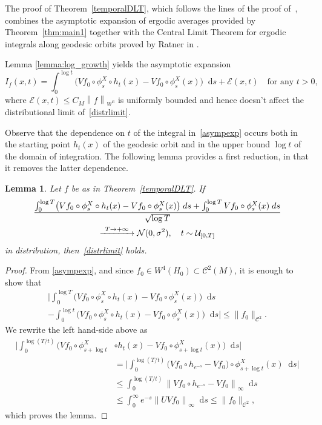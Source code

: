 \documentclass[11pt]{article}
\newcommand\To[1]{\mathchoice{\xrightarrow{\kern4pt#1\kern3pt}}{\stackrel{#1}{\longrightarrow}}{}{}}
\newcommand{\nnorm}[1]{\lVert#1\rVert}
\newcommand {\cN}{\mathcal{N}}
\newcommand*{\diff}{\mathop{}\!\mathrm{d}}
\newcommand{\norm}[1]{\left\lVert#1\right\rVert}
\newtheorem {lemma}[theorem]{Lemma}
\theoremstyle{definition}
\begin{document}
\begin{appendix}
The proof of Theorem~\ref{temporalDLT}, which follows the lines of the proof of~\cite[Th.\,5.1]{Dolgopyat-Sarig}, combines the asymptotic expansion of ergodic averages provided by Theorem~\ref{thm:main1} together with the Central Limit Theorem for ergodic integrals along geodesic orbits proved by Ratner in \cite{Rat:CLT}.

Lemma \ref{lemma:log_growth} yields the asymptotic expansion
\begin{equation}
\label{asympexp}
I_f(x,t)=\int_0^{\log{t}}\bigl(Vf_0\circ \phi^{X}_s\circ h_t(x)-Vf_0\circ \phi_s^{X}(x) \bigr)\diff s +\mathcal{E}(x,t) \quad\text{for any }t>0,
\end{equation}
where $\mathcal{E}(x,t) \leq C_M\norm{f}_{W^6}$ is uniformly bounded and hence doesn't affect the distributional limit of~\eqref{distrlimit}.

Observe that the dependence on $t$ of the integral in~\eqref{asympexp} occurs both in the starting point $h_t(x)$ of the geodesic orbit and in the upper bound $\log{t}$ of the domain of integration. The following lemma provides a first reduction, in that it removes the latter dependence.

\begin{lemma}
Let $f$ be as in Theorem~\ref{temporalDLT}. If
\begin{multline*}
\frac{\int_0^{\log{T}}\bigl(Vf_0\circ \phi^{X}_s\circ h_t(x)-Vf_0\circ \phi_s^{X}(x) \bigr)\;\emph{d}s+\int_0^{\log{T}}Vf_0\circ\phi^{X}_s(x)\;\emph{d}s}{\sqrt{\log{T}}}\\
\To{T\to+\infty}\cN(0,\sigma^{2}), \quad
 t\sim \mathcal{U}_{[0,T]}
\end{multline*}
in distribution, then~\eqref{distrlimit} holds.
\end{lemma}
\begin{proof}
From \eqref{asympexp}, and since $f_0 \in W^4(H_0) \subset \mathscr{C}^2(M)$, it is enough to show that
\begin{multline*}
\biggl\lvert \int_0^{\log{T}}\bigl(Vf_0\circ \phi^{X}_s\circ h_t(x)-Vf_0\circ \phi_s^{X}(x) \bigr) \diff s \\
- \int_0^{\log{t}}\bigl(Vf_0\circ \phi^{X}_s\circ h_t(x)-Vf_0\circ \phi_s^{X}(x) \bigr) \diff s \biggr \rvert \leq \nnorm{f_0}_{\mathscr{C}^2}.
\end{multline*}
We rewrite the left hand-side above as
\begin{align*}
\biggl\lvert \int_0^{\log{(T/t)}}\bigl(Vf_0\circ \phi^{X}_{s+ \log t}&\circ h_t(x)-Vf_0\circ \phi_{s+\log t}^{X}(x) \bigr) \diff s \biggr\rvert\\
&= \biggl\lvert \int_0^{\log{(T/t)}}\bigl(Vf_0\circ h_{e^{-s}} - Vf_0 \bigr) \circ \phi^{X}_{s+ \log t}(x) \diff s \biggr\rvert\\
&\leq \int_0^{\log{(T/t)}} \norm{Vf_0\circ h_{e^{-s}} - Vf_0}_{\infty} \diff s \\
&\leq \int_0^{\infty} e^{-s} \norm{UVf_0}_{\infty} \diff s \leq \nnorm{f_0}_{\mathscr{C}^2},
\end{align*}
which proves the lemma.
\end{proof}


\end{appendix}
\end{document}
